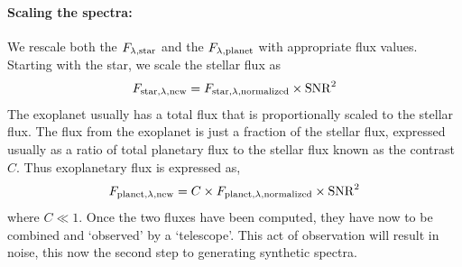 \paragraph{Scaling the spectra:}
We rescale both the $F_{\rm{\lambda,star}}$ and the $F_{\rm{\lambda,planet}}$ with appropriate flux values.
Starting with the star, we scale the stellar flux as
\begin{equation}
    F_{\rm{star,\lambda,new}} = F_{\rm{star,\lambda,normalized}}\times\rm{SNR}^2
    \label{eq:scaling of F}
\end{equation}
The exoplanet usually has a total flux that is proportionally scaled to the stellar flux.
The flux from the exoplanet is just a fraction of the stellar flux, expressed usually as a ratio of total planetary flux to the stellar flux known as the contrast $C$.
Thus exoplanetary flux is expressed as,
\begin{equation}
    F_{\rm{planet},\lambda,new} = C\times F_{\rm{planet},\lambda,normalized}\times \rm{SNR}^2
    \label{eq:exoplanet flux}
\end{equation}
where $C\ll1$.
Once the two fluxes have been computed, they have now to be combined and `observed' by a `telescope'.
This act of observation will result in noise, this now the second step to generating synthetic spectra.
